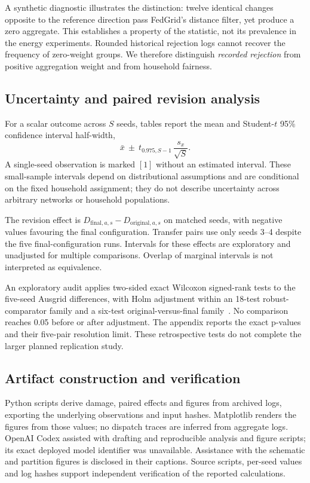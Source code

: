 \documentclass[preprint,12pt,a4paper]{elsarticle}
\begin{document}
A synthetic diagnostic illustrates the distinction: twelve identical changes opposite to the reference direction pass FedGrid's distance filter, yet produce a zero aggregate. This establishes a property of the statistic, not its prevalence in the energy experiments. Rounded historical rejection logs cannot recover the frequency of zero-weight groups. We therefore distinguish \emph{recorded rejection} from positive aggregation weight and from household fairness.

\subsection{Uncertainty and paired revision analysis}
For a scalar outcome across $S$ seeds, tables report the mean and Student-$t$ 95\% confidence interval half-width,
\begin{equation}
\bar x\ \pm\ t_{0.975,S-1}\,\frac{s_x}{\sqrt S}.
\end{equation}
A single-seed observation is marked $[1]$ without an estimated interval. These small-sample intervals depend on distributional assumptions and are conditional on the fixed household assignment; they do not describe uncertainty across arbitrary networks or household populations.

The revision effect is $D_{\mathrm{final},a,s}-D_{\mathrm{original},a,s}$ on matched seeds, with negative values favouring the final configuration. Transfer pairs use only seeds 3--4 despite the five final-configuration runs. Intervals for these effects are exploratory and unadjusted for multiple comparisons. Overlap of marginal intervals is not interpreted as equivalence.

An exploratory audit applies two-sided exact Wilcoxon signed-rank tests to the five-seed Ausgrid differences, with Holm adjustment within an 18-test robust-comparator family and a six-test original-versus-final family~\cite{scipywilcoxon,holm}. No comparison reaches 0.05 before or after adjustment. The appendix reports the exact p-values and their five-pair resolution limit. These retrospective tests do not complete the larger planned replication study.

\subsection{Artifact construction and verification}
Python scripts derive damage, paired effects and figures from archived logs, exporting the underlying observations and input hashes. Matplotlib renders the figures from those values; no dispatch traces are inferred from aggregate logs. OpenAI Codex assisted with drafting and reproducible analysis and figure scripts; its exact deployed model identifier was unavailable. Assistance with the schematic and partition figures is disclosed in their captions. Source scripts, per-seed values and log hashes support independent verification of the reported calculations.
\end{document}
